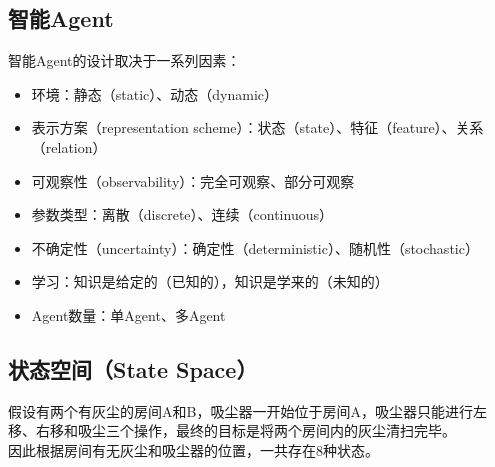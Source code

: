 \subsection{智能Agent}

智能Agent的设计取决于一系列因素：

\begin{itemize}
    \item 环境：静态（static）、动态（dynamic）
    \item 表示方案（representation scheme）：状态（state）、特征（feature）、关系（relation）
    \item 可观察性（observability）：完全可观察、部分可观察
    \item 参数类型：离散（discrete）、连续（continuous）
    \item 不确定性（uncertainty）：确定性（deterministic）、随机性（stochastic）
    \item 学习：知识是给定的（已知的），知识是学来的（未知的）
    \item Agent数量：单Agent、多Agent
\end{itemize}

\vspace{0.5cm}

\subsection{状态空间（State Space）}

假设有两个有灰尘的房间A和B，吸尘器一开始位于房间A，吸尘器只能进行左移、右移和吸尘三个操作，最终的目标是将两个房间内的灰尘清扫完毕。\\

因此根据房间有无灰尘和吸尘器的位置，一共存在8种状态。\\

